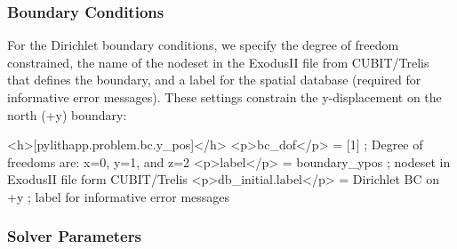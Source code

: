 \subsubsection{Boundary Conditions}

For the Dirichlet boundary conditions, we specify the degree of
freedom constrained, the name of the nodeset in the ExodusII file from
CUBIT/Trelis that defines the boundary, and a label for the spatial
database (required for informative error messages). These settings
constrain the y-displacement on the north (+y) boundary:
\begin{cfg}
<h>[pylithapp.problem.bc.y_pos]</h>
<p>bc_dof</p> = [1] ; Degree of freedoms are: x=0, y=1, and z=2
<p>label</p> = boundary_ypos ; nodeset in ExodusII file form CUBIT/Trelis
<p>db_initial.label</p> = Dirichlet BC on +y ; label for informative error messages
\end{cfg}

\subsubsection{Solver Parameters}


